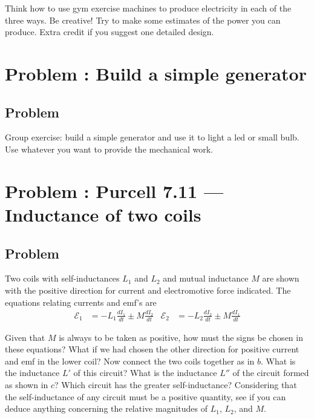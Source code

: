 \documentclass[solutions]{esg8022pset}
\begin{document}
  Think how to use gym exercise machines to produce electricity in each of the three ways. Be creative!
  Try to make some estimates of the power you can produce. Extra credit if you suggest one detailed design.
\section{Problem \thesection: Build a simple generator}
\subsection{Problem}
  Group exercise: build a simple generator and use it to light a led or small bulb. Use whatever you want to
  provide the mechanical work.
\section{Problem \thesection: Purcell 7.11 --- Inductance of two coils}
\subsection{Problem}
  Two coils with self-inductances $L_1$ and $L_2$ and mutual inductance $M$  are shown with the positive direction for current and electromotive force indicated. The equations relating currents and emf's are
  \begin{align*}
    \mathcal{E}_1 & = -L_1\frac{dI_1}{dt}\pm M\frac{dI_2}{dt}
    & \mathcal{E}_2 & = -L_2\frac{dI_2}{dt}\pm M\frac{dI_1}{dt}
  \end{align*}

  Given that $M$ is always to be taken as positive, how must the signs be chosen in these equations? What if we had chosen the other direction for positive current and emf in the lower coil? Now connect the two coils together as in $b$. What is the inductance $L'$ of this circuit? What is the inductance $L''$ of the circuit formed as shown in $c$? Which circuit has the greater self-inductance? Considering that the self-inductance of any circuit must be a positive quantity, see if you can deduce anything concerning the relative magnitudes of $L_1$, $L_2$, and $M$.
\end{document}
